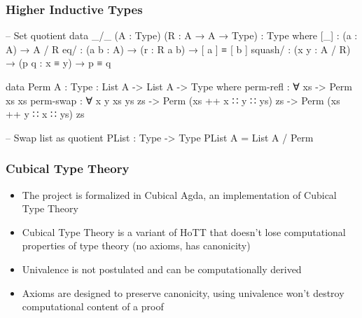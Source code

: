\documentclass[9pt]{beamer}
\begin{document}
\begin{frame}[fragile]
\frametitle{Higher Inductive Types}

\begin{code}
-- Set quotient
data _/_ (A : Type) (R : A → A → Type) : Type where
  [_] : (a : A) → A / R
  eq/ : (a b : A) → (r : R a b) → [ a ] ≡ [ b ]
  squash/ : (x y : A / R) → (p q : x ≡ y) → p ≡ q

data Perm {A : Type} : List A -> List A -> Type where
  perm-refl : ∀ {xs} -> Perm xs xs
  perm-swap : ∀ {x y xs ys zs}
    -> Perm (xs ++ x ∷ y ∷ ys) zs
    -> Perm (xs ++ y ∷ x ∷ ys) zs

-- Swap list as quotient
PList : Type -> Type
PList A = List A / Perm
\end{code}

\end{frame}

\begin{frame}
\frametitle{Cubical Type Theory}

\begin{itemize}

  \item The project is formalized in Cubical Agda, an implementation of Cubical Type Theory
  \item Cubical Type Theory is a variant of HoTT that doesn't lose computational properties of type theory (no axioms, has canonicity)
  \item Univalence is not postulated and can be computationally derived
  \item Axioms are designed to preserve canonicity, using univalence won't destroy computational content of a proof

\end{itemize}


\end{frame}
\end{document}

